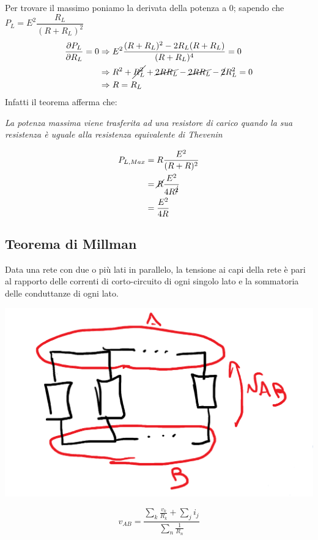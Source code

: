 \documentclass{article}
\begin{document}
Per trovare il massimo poniamo la derivata della potenza a 0; sapendo che $P_L = E^2 \dfrac{R_L}{(R+R_L)^2}$
\begin{align*}
    \dfrac{\partial P_L}{\partial R_L}=0 &\Rightarrow E^2 \dfrac{(R+R_L)^2 - 2R_L(R+R_L)}{(R+R_L)^4}=0\\
    & \Rightarrow R^2 + \cancel{R^2_L} + \cancel{2RR_L} - \cancel{2RR_L} -\cancel{2}R^2_L = 0\\
    &\Rightarrow R=R_L
\end{align*} 
Infatti il teorema afferma che:
\begin{center}
    \textit{La potenza massima viene trasferita ad una resistore di carico quando la sua resistenza è uguale alla resistenza equivalente di Thevenin}
\end{center}

\begin{align*}
    P_{L,Max} &= R \dfrac{E^2}{(R+R)^2}\\
    &= \cancel{R} \dfrac{E^2}{4R^{\cancel{2}}}\\
    &= \dfrac{E^2}{4R}
\end{align*}



\subsection{Teorema di Millman}
Data una rete con due o più lati in parallelo, la tensione ai capi della rete è pari al rapporto delle correnti di corto-circuito di ogni singolo lato e la sommatoria delle conduttanze di ogni lato.
\begin{center}
    \includegraphics[scale=0.26]{Image/Th_Millman_0.png}
\end{center}
\[
    v_{AB} = \frac{\sum\limits_k \frac{v_k}{R_k} + \sum\limits_j i_j}{\sum\limits_n\frac{1}{R_n}}
\]
\end{document}
